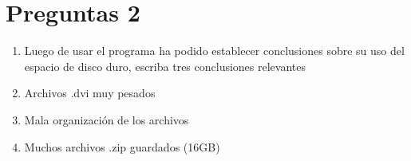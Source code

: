 \documentclass{article}
\begin{document}
\section{Preguntas 2}
\label{sec:orgc90f806}
\begin{enumerate}
\item Luego de usar el programa ha podido establecer conclusiones sobre
su uso del espacio de disco duro, escriba tres conclusiones
relevantes

\item Archivos .dvi muy pesados
\item Mala organización de los archivos
\item Muchos archivos .zip guardados (16GB)
\end{enumerate}
\end{document}
